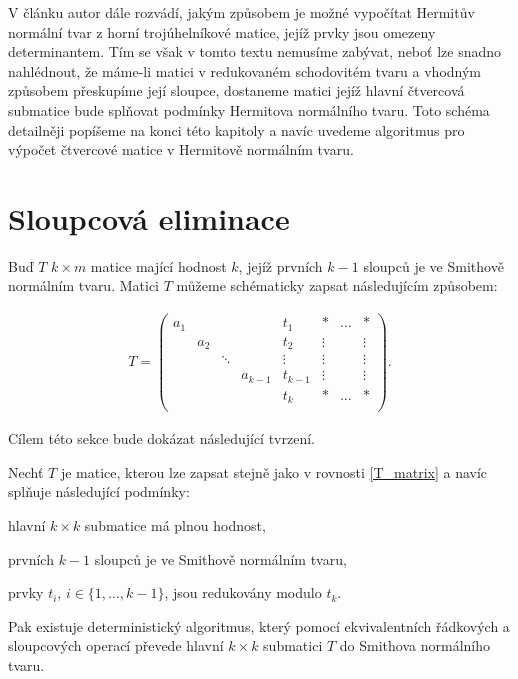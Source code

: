 V článku \cite{SNF_Arne} autor dále rozvádí, jakým způsobem je možné vypočítat
Hermitův normální tvar z horní trojúhelníkové matice, jejíž prvky jsou omezeny
determinantem. Tím se však v tomto textu nemusíme zabývat, neboť lze snadno
nahlédnout, že máme-li matici v redukovaném schodovitém tvaru a vhodným způsobem
přeskupíme její sloupce, dostaneme matici jejíž hlavní čtvercová submatice bude
splňovat podmínky Hermitova normálního tvaru. Toto schéma detailněji popíšeme
na konci této kapitoly a navíc uvedeme algoritmus pro výpočet \snf{} čtvercové
matice v Hermitově normálním tvaru.


\section{Sloupcová eliminace}

Buď $ T $ $ k \times m $ matice mající hodnost $ k $, jejíž prvních $ k - 1 $
sloupců je ve Smithově normálním tvaru. Matici $ T $ můžeme schématicky zapsat
následujícím způsobem:

\begin{align} \label{T_matrix}
T =
    \left(
    \begin{array}{ccccc|ccc}
        a_1 &     &        &         & t_1     & \ast   & \hdots & \ast   \\
            & a_2 &        &         & t_2     & \vdots &        & \vdots \\
            &     & \ddots &         & \vdots  & \vdots &        & \vdots \\
            &     &        & a_{k-1} & t_{k-1} & \vdots &        & \vdots \\
            &     &        &         & t_k     & \ast   & \hdots & \ast   \\
    \end{array}
    \right)
.
\end{align}

Cílem této sekce bude dokázat následující tvrzení.

\begin{vet} \label{Sloup_elim}
Nechť $ T $ je matice, kterou lze zapsat stejně jako v rovnosti \ref{T_matrix}
a navíc splňuje následující podmínky:
\begin{Cond}[series=Sloup_elim_CONDS]
    \item hlavní $ k \times k $ submatice má plnou hodnost,
    \item prvních $ k - 1 $ sloupců je ve Smithově normálním tvaru,
    \item prvky $ t_i $, $ i \in \{1,\dots, k-1\} $, jsou redukovány modulo $ t_k $.
\end{Cond}
Pak existuje deterministický algoritmus, který pomocí ekvivalentních řádkových
a sloupcových operací převede hlavní $ k \times k $ submatici $ T $ do
Smithova normálního tvaru.
\end{vet}

